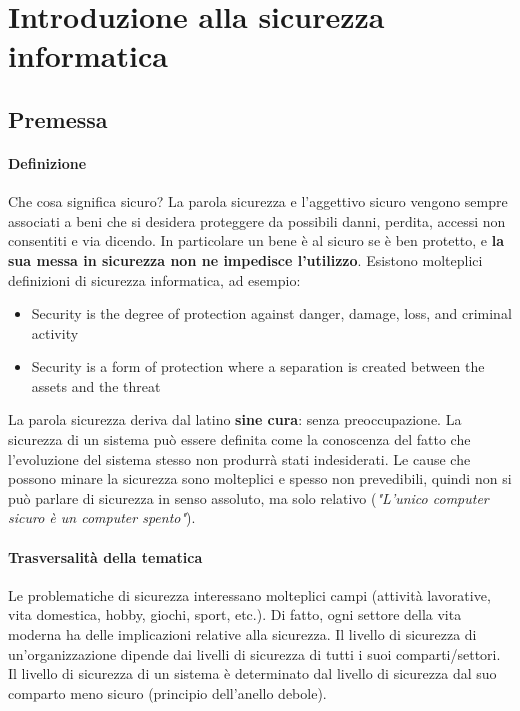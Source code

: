 \chapter{Introduzione alla sicurezza informatica}


\section{Premessa}

\subsubsection{Definizione}
Che cosa significa sicuro? La parola sicurezza e l'aggettivo sicuro vengono sempre associati a beni che si desidera proteggere da possibili danni, perdita, accessi non consentiti e via dicendo. In particolare un bene è al sicuro se è ben protetto, e \textbf{la sua messa in sicurezza non ne impedisce l'utilizzo}. Esistono molteplici definizioni di sicurezza informatica, ad esempio:
\begin{itemize} 
  \item Security is the degree of protection against danger, damage, loss, and criminal activity 
  \item Security is a form of protection where a separation is created between the assets and the threat 
\end{itemize}
La parola sicurezza deriva dal latino \textbf{sine cura}: senza preoccupazione. La sicurezza di un sistema può essere definita come la conoscenza del fatto che l'evoluzione del sistema stesso non produrrà stati indesiderati. Le cause che possono minare la sicurezza sono molteplici e spesso non prevedibili, quindi non si può parlare di sicurezza in senso assoluto, ma solo relativo (\textit{"L'unico computer sicuro è un computer spento"}).

\subsubsection{Trasversalità della tematica}
Le problematiche di sicurezza interessano molteplici campi (attività lavorative, vita domestica, hobby, giochi, sport, etc.). Di fatto, ogni settore della vita moderna ha delle implicazioni relative alla sicurezza. Il livello di sicurezza di un'organizzazione dipende dai livelli di sicurezza di tutti i suoi comparti/settori. Il livello di sicurezza di un sistema è determinato dal livello di sicurezza dal suo comparto meno sicuro (principio dell'anello debole).



